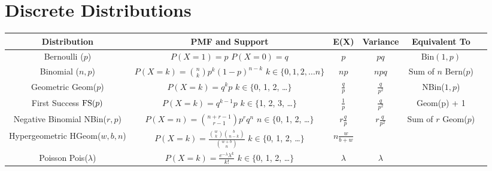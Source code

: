 \documentclass[11pt]{article}
\theoremstyle{definition}
\theoremstyle{remark}
\newcommand{\Bin}{\text{Bin}}
\newcommand{\Bern}{\text{Bern}}
\newcommand{\NBin}{\textnormal{NBin}}
\newcommand{\Geom}{\textnormal{Geom}}
\newcommand{\FS}{\textnormal{FS}}
\newcommand{\HGeom}{\textnormal{HGeom}}
\newcommand{\Pois}{\textnormal{Pois}}
\begin{document}
\section{Discrete Distributions}
\begin{center}
\renewcommand{\arraystretch}{2}
\begin{tabular}{cccccc}
\textbf{Distribution} & \textbf{PMF and Support} & \textbf{E(X)}  & \textbf{Variance} & \textbf{Equivalent To}\\
\hline
\shortstack{Bernoulli \\ \Bern($p$)} & \shortstack{$P(X=1) = p$ \\$ P(X=0) = q$} & $p$ & $pq$ & $\Bin(1, p)$ \\
\hline
\shortstack{Binomial \\ \Bin($n, p$)} & \shortstack{$P(X=k) = {n \choose k}p^k(1-p)^{n-k}$  \\ $k \in \{0, 1, 2, \dots n\}$}& $np$ & $npq$ & Sum of $n$ Bern($p$) \\
\hline
\shortstack{Geometric \\ \Geom($p$)} & \shortstack{$P(X=k) = q^kp$  \\ $k \in \{$0, 1, 2, \dots $\}$}& $\frac{q}{p}$ & $\frac{q}{p^2}$ & \NBin($1, p$)\\
\hline
\shortstack{First Success \\ $\FS(p)$} & \shortstack{$P(X=k) = q^{k-1}p$  \\ $k \in \{$1, 2, 3, \dots $\}$}& $\frac{1}{p}$ & $\frac{q}{p^2}$ & \Geom(p) + 1\\
\hline
\shortstack{Negative Binomial \\ \NBin($r, p$)} & \shortstack{$P(X=n) = {n+r - 1 \choose r -1}p^rq^n$ \\ $n \in \{$0, 1, 2, \dots $\}$} & $r\frac{q}{p}$ & $r\frac{q}{p^2}$ &  Sum of $r$ Geom($p$)\\
\hline
\shortstack{Hypergeometric \\ \HGeom($w, b, n$)} & \shortstack{$P(X=k) = \frac{{w \choose k}{b \choose n-k}}{{w + b \choose n}}$ \\ $k \in \{$0, 1, 2, \dots $\}$} & $n\frac{w}{b+w}$ &&  \\
\hline
\shortstack{Poisson \\ \Pois($\lambda$)} & \shortstack{$P(X=k) = \frac{e^{-\lambda}\lambda^k}{k!}$ \\ $k \in \{$0, 1, 2, \dots $\}$} & $\lambda$ & $\lambda$ &  \\

\end{tabular}
\end{center}
\end{document}
